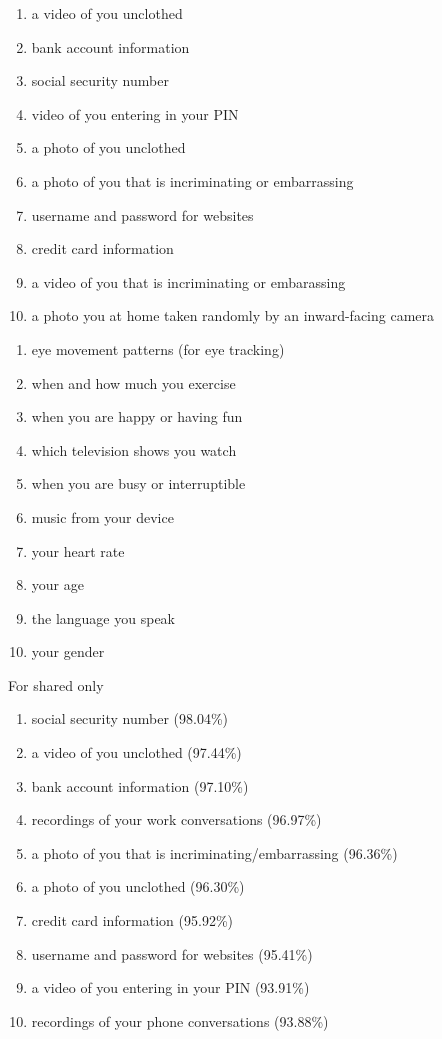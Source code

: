 \documentclass{acm_proc_article-sp}
\begin{document}
\begin{enumerate} \itemsep1pt \parskip0pt 
  \item a video of you unclothed
  \item bank account information
  \item social security number
  \item video of you entering in your PIN
  \item a photo of you unclothed
  \item a photo of you that is incriminating or embarrassing
  \item username and password for websites
  \item credit card information
  \item a video of you that is incriminating or embarassing
  \item a photo you at home taken randomly by an inward-facing camera \\[-.8cm]
\end{enumerate}

\begin{enumerate} \itemsep1pt \parskip0pt 
  \setcounter{enumi}{63}
  \item eye movement patterns (for eye tracking)
  \item when and how much you exercise
  \item when you are happy or having fun
  \item which television shows you watch
  \item when you are busy or interruptible
  \item music from your device
  \item your heart rate
  \item your age 
  \item the language you speak
  \item your gender \\[-.8cm]
\end{enumerate}

For shared only \\[-.8cm]

\begin{enumerate} \itemsep1pt \parskip0pt 
  \item social security number (98.04\%)
  \item a video of you unclothed (97.44\%)
  \item bank account information (97.10\%)
  \item recordings of your work conversations (96.97\%)
  \item a photo of you that is incriminating/embarrassing (96.36\%)
  \item a photo of you unclothed (96.30\%)
  \item credit card information (95.92\%)
  \item username and password for websites (95.41\%)
  \item a video of you entering in your PIN (93.91\%)
  \item recordings of your phone conversations (93.88\%) \\[-.8cm]
\end{enumerate}
\end{document}
